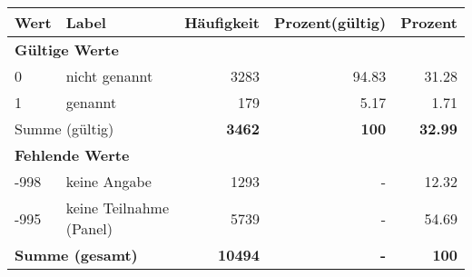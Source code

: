      \begin{longtable}{lXrrr}
     \toprule
     \textbf{Wert} & \textbf{Label} & \textbf{Häufigkeit} & \textbf{Prozent(gültig)} & \textbf{Prozent} \\
     \endhead
     \midrule
     \multicolumn{5}{l}{\textbf{Gültige Werte}}\\

     0 &
     \multicolumn{1}{X}{ nicht genannt   } &


       \num{3283} &
       \num[round-mode=places,round-precision=2]{94.83} &
         \num[round-mode=places,round-precision=2]{31.28} \\

     1 &
     \multicolumn{1}{X}{ genannt   } &


       \num{179} &
       \num[round-mode=places,round-precision=2]{5.17} &
         \num[round-mode=places,round-precision=2]{1.71} \\
     \midrule
     \multicolumn{2}{l}{Summe (gültig)} &
       \textbf{\num{3462}} &
     \textbf{\num{100}} &
       \textbf{\num[round-mode=places,round-precision=2]{32.99}} \\
     \multicolumn{5}{l}{\textbf{Fehlende Werte}}\\
       -998 &
       keine Angabe &
         \num{1293} &
        - &
         \num[round-mode=places,round-precision=2]{12.32} \\
       -995 &
       keine Teilnahme (Panel) &
         \num{5739} &
        - &
         \num[round-mode=places,round-precision=2]{54.69} \\
     \midrule
     \multicolumn{2}{l}{\textbf{Summe (gesamt)}} &
          \textbf{\num{10494}} &
        \textbf{-} &
        \textbf{\num{100}} \\
     \bottomrule
     \end{longtable}
     
